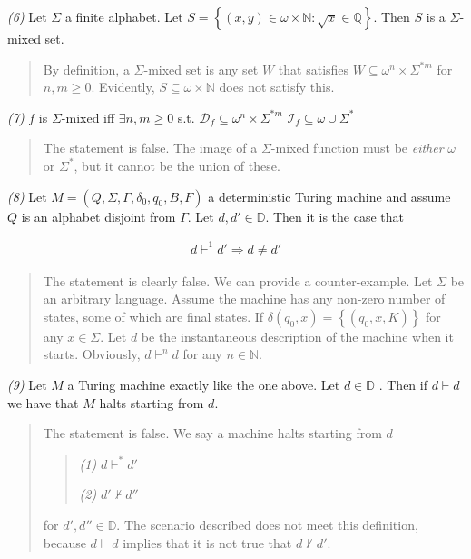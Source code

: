 \documentclass[a4paper, 12pt]{article}
\begin{document}
\textit{(6)} Let $\Sigma$ a finite alphabet. Let $S = \left\{ (x, y) \in
\omega\times \mathbb{N} : \sqrt{x} \in \mathbb{Q}  \right\}$. Then $S$ is a
$\Sigma$-mixed set.

\small
\begin{quote}

By definition, a $\Sigma$-mixed set is any set $W$ that satisfies $W \subseteq
\omega^{n} \times \Sigma^{*m} $ for $n, m \geq 0$. Evidently, $S \subseteq
\omega \times \mathbb{N}$ does not satisfy this.

\end{quote}
\normalsize


\textit{(7)} $f$ is $\Sigma$-mixed iff $\exists n, m \geq 0$ s.t. $\mathcal{D}_f
\subseteq \omega^{n} \times \Sigma^{*m} $ \land $\mathcal{I}_f \subseteq \omega
\cup \Sigma^{*}$


\small
\begin{quote}

The statement is false. The image of a $\Sigma$-mixed function must be
\textit{either} $\omega$ or $\Sigma^{*}$, but it cannot be the union of these. 

\end{quote}
\normalsize




\textit{(8)} Let $M = (Q, \Sigma, \Gamma, \delta_0, q_0, B, F)$ a deterministic
Turing machine and assume $Q$ is an alphabet disjoint from $\Gamma$. Let $d, d'
\in \mathbb{D}$. Then it is the case that 

\begin{align*}
    d \vdash^1 d' \Rightarrow d\neq d'
\end{align*}


\small
\begin{quote}

The statement is clearly false. We can provide a counter-example. Let $\Sigma$
be an arbitrary language. Assume the machine has any non-zero number of states,
some of which are final states. If $\delta(q_0, x) = \left\{ (q_0, x, K)
\right\} $ for any $x \in \Sigma$. Let $d$ be the instantaneous description of
the machine when it starts. Obviously, $d \vdash^n d$ for any $n \in
\mathbb{N}$.

\end{quote}
\normalsize


\textit{(9)} Let $M$ a Turing machine exactly like the one above. Let $d \in
\mathbb{D}$ . Then if $d \vdash d$ we have that $M$ halts starting from $d$.


\small
\begin{quote}

    The statement is false. We say a machine halts starting from $d$ 

    \begin{quote}
        \textit{(1)} $d \vdash^{*} d'$ 

        \textit{(2)} $d' \not\vdash d''$
    \end{quote}

    for $d', d'' \in \mathbb{D}$. The scenario described does not meet this
    definition, because $d \vdash d$ implies that it is not true that $d
    \not\vdash d'$.
\end{quote}
\normalsize
\end{document}
